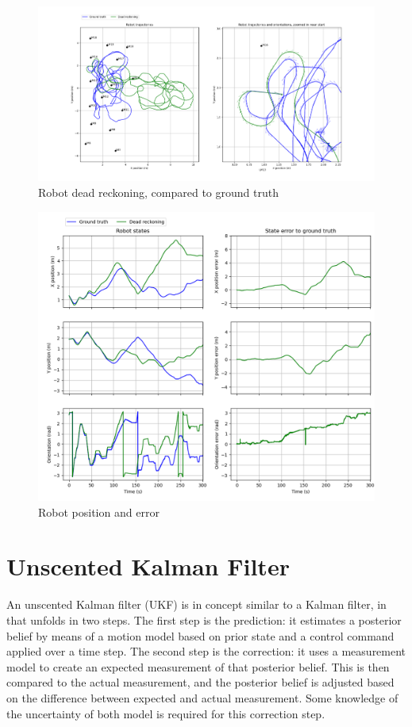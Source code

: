 \documentclass{article}
\begin{document}
\begin{figure}
\centering
\includegraphics[scale=0.3]{Figure_2.png}
\caption{Robot dead reckoning, compared to ground truth}
\label{fig:figure2}
\end{figure}

\begin{figure}
\centering
\includegraphics[scale=0.3]{Figure_3.png}
\caption{Robot position and error}
\label{fig:figure3}
\end{figure}

\section{Unscented Kalman Filter}

An unscented Kalman filter (UKF) is in concept similar to a Kalman filter, in that unfolds in two steps. The first step is the prediction: it estimates a posterior belief by means of a motion model based on prior state and a control command applied over a time step. The second step is the correction: it uses a measurement model to create an expected measurement of that posterior belief. This is then compared to the actual measurement, and the posterior belief is adjusted based on the difference between expected and actual measurement. Some knowledge of the uncertainty of both model is required for this correction step.
\end{document}
